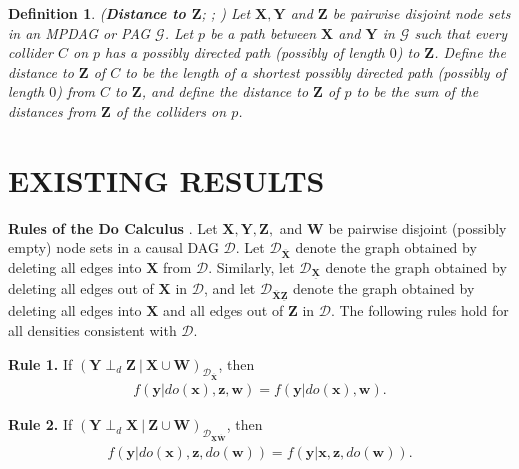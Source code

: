 \documentclass[twoside]{article}
\newtheorem{definition}[theorem]{Definition}
\newcommand\given[1][]{\:#1\vert\:}
\newcommand{\mb}[1]{\mathbf{#1}}
\newcommand{\dsepp}{\perp_{d}}
\newcommand{\g}[1][G]{\mathcal{#1}}
\begin{document}
\begin{definition}
\label{def:distance}
{\normalfont (\textbf{Distance to $\mb{Z}$}; \citealp{zhang2006causal}; \citealp{perkovic2017interpreting})} 
    Let $\mb{X,Y}$ and $\mb{Z}$ be pairwise disjoint node sets in an MPDAG or PAG $\g$. Let $p$ be a path between $\mb{X}$ and $\mb{Y}$ in $\g$ such that every collider $C$ on $p$ has a possibly directed path (possibly of length $0$) to $\mb{Z}$. Define the \textit{distance to $\mb{Z}$} of $C$ to be the length of a shortest possibly directed path (possibly of length $0$) from $C$ to $\mb{Z}$, and define the \textit{distance to $\mb{Z}$} of $p$ to be the sum of the distances from $\mb{Z}$ of the colliders on $p$.
\end{definition}












\section{EXISTING RESULTS}
\label{supp:existing}


\textbf{Rules of the Do Calculus} \citep{pearl2009causality}.
Let $\mb{X,Y,Z,}$ and $\mb{W}$ be pairwise disjoint (possibly empty) node sets in a causal DAG $\g[D]$. Let $\g[D]_{\overline{\mb{X}}}$ denote the graph obtained by deleting all edges into $\mb{X}$ from $\g[D]$. Similarly, let $\g[D]_{\underline{\mb{X}}}$ denote the graph obtained by deleting all edges out of $\mb{X}$ in $\g[D]$, and let $\g[D]_{\overline{\mb{X}}\underline{\mb{Z}}}$ denote the graph obtained by deleting all edges into $\mb{X}$ and all edges out of $\mb{Z}$ in $\g[D]$. The following rules hold for all densities consistent with $\g[D]$.

\textbf{Rule 1.} If $(\mb{Y} \dsepp \mb{Z} \given \mb{X} \cup \mb{W})_{\g[D]_{\overline{\mb{X}}}}$, then
    \begin{align}
        f(\mb{y} | do(\mb{x}),\mb{z,w}) = f(\mb{y} | do(\mb{x}),\mb{w}). \label{eq:rule1-do}
    \end{align}

\textbf{Rule 2.} If $(\mb{Y} \dsepp \mb{X} \given \mb{Z} \cup \mb{W})_{\g[D]_{\underline{\mb{X}}\overline{\mb{W}}}}$, then
    \begin{align}
        f(\mb{y} | do(\mb{x}),\mb{z},do(\mb{w})) = f(\mb{y} | \mb{x},\mb{z},do(\mb{w})). \label{eq:rule2-do}
    \end{align}
\end{document}
